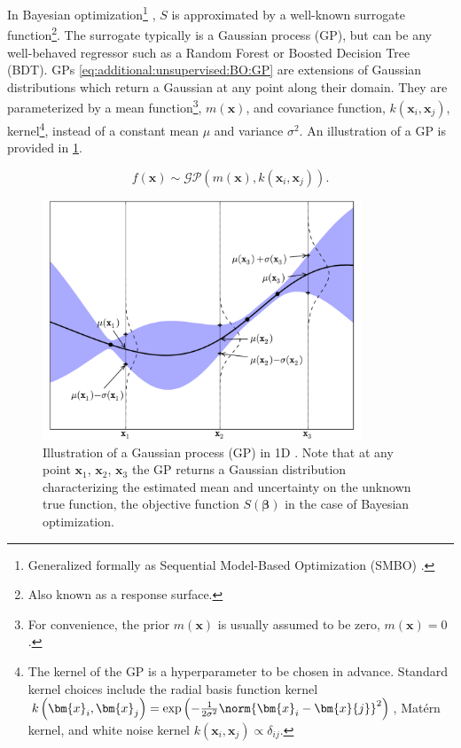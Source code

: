 In Bayesian optimization\footnote{Generalized
formally as Sequential Model-Based Optimization (SMBO) \cite{NIPS2011_4443}.} \cite{Brochu2010,1301.1942,Borisyak,NIPS2011_4443},
$S$ is approximated by a well-known surrogate function\footnote{Also known as a response surface.}.
The surrogate typically is a Gaussian process (GP),
but can be any well-behaved regressor such as
a Random Forest or Boosted Decision Tree (BDT).
GPs \cref{eq:additional:unsupervised:BO:GP} are
extensions of Gaussian distributions which return a Gaussian at any point along their domain.
They are parameterized by a mean function\footnote{For convenience,
the prior $m\left(\bm{x}\right)$ is usually assumed to be zero, $m\left(\bm{x}\right)=0$.}, $m\left(\bm{x}\right)$,
and covariance function, $k\left(\bm{x}_{i}, \bm{x}_{j}\right)$,
\ie kernel\footnote{The kernel of the GP is a hyperparameter to be chosen in advance.
Standard kernel choices include
the radial basis function kernel $k\left(\bm{x}_{i}, \bm{x}_{j}\right) = \exp\left(-\frac{1}{2\sigma^{2}}\norm{\bm{x}_{i}-\bm{x}{j}}^{2}\right)$,
Mat\'{e}rn kernel,
and white noise kernel $k\left(\bm{x}_{i}, \bm{x}_{j}\right) \propto \delta_{ij}$.},
instead of a constant mean $\mu$ and variance $\sigma^{2}$.
An illustration of a GP is provided in \cref{fig:additional:unsupervised:BO:GP_ex}.

\begin{equation}\label{eq:additional:unsupervised:BO:GP}
f\left(\bm{x}\right) \sim \mathcal{GP}\left(m\left(\bm{x}\right), k\left(\bm{x}_{i}, \bm{x}_{j}\right)\right).
\end{equation}

\begin{figure}[H] %
\centering
\includegraphics[width=0.85\textwidth]{figures/ml/gp.pdf}
\caption{
Illustration of a Gaussian process (GP) in 1D \cite{Brochu2010}.
Note that at any point $\bm{x}_{1}$, $\bm{x}_{2}$, $\bm{x}_{3}$ the GP
returns a Gaussian distribution characterizing the estimated mean and uncertainty on the
unknown true function, \ie the objective function $S\left(\bm{\beta}\right)$ in the case of Bayesian optimization.
}
\label{fig:additional:unsupervised:BO:GP_ex}
\end{figure}

